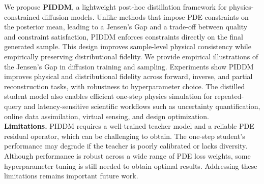 \documentclass{article}
\theoremstyle{plain}
\theoremstyle{definition}
\theoremstyle{remark}
\begin{document}


We propose \textbf{PIDDM}, a lightweight post-hoc distillation framework for physics-constrained diffusion models. Unlike methods that impose PDE constraints on the posterior mean, leading to a Jensen's Gap and a trade-off between quality and constraint satisfaction, PIDDM enforces constraints directly on the final generated sample. This design improves sample-level physical consistency while empirically preserving distributional fidelity. We provide empirical illustrations of the Jensen's Gap in diffusion training and sampling. Experiments show PIDDM improves physical and distributional fidelity across forward, inverse, and partial reconstruction tasks, with robustness to hyperparameter choice. The distilled student model also enables efficient one-step physics simulation for repeated-query and latency-sensitive scientific workflows such as uncertainty quantification, online data assimilation, virtual sensing, and design optimization.\\
\noindent\textbf{Limitations.} PIDDM requires a well-trained teacher model and a reliable PDE residual operator, which can be challenging to obtain. The one-step student's performance may degrade if the teacher is poorly calibrated or lacks diversity. Although performance is robust across a wide range of PDE loss weights, some hyperparameter tuning is still needed to obtain optimal results. Addressing these limitations remains important future work.
\end{document}
